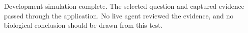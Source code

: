 \documentclass{article}
\begin{document}
Development simulation complete. The selected question and captured evidence passed through the application. No live agent reviewed the evidence, and no biological conclusion should be drawn from this test.\cite{dapper:Claim.eETZorG7bt4idUW2Pl2Ig8SriK3PGRa7-r1}


\end{document}
